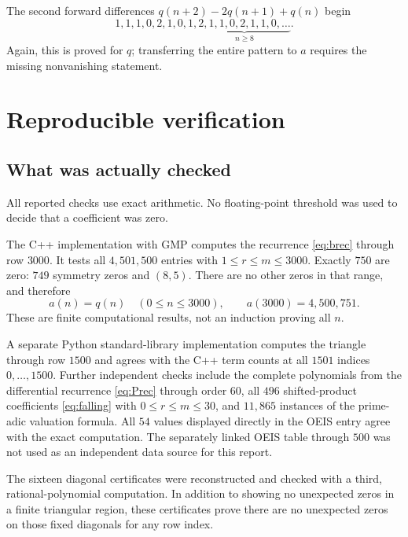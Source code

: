 \documentclass[11pt,a4paper]{article}
\numberwithin{equation}{section}
\theoremstyle{definition}
\theoremstyle{remark}
\begin{document}
The second forward differences $q(n+2)-2q(n+1)+q(n)$ begin
\[
 1,1,1,0,2,1,0,1,\underbrace{2,1,1,0,2,1,1,0,\ldots}_{n\ge8}.
\]
Again, this is proved for $q$; transferring the entire pattern to $a$
requires the missing nonvanishing statement.

\section{Reproducible verification}\label{sec:computation}

\subsection{What was actually checked}
All reported checks use exact arithmetic. No floating-point threshold was
used to decide that a coefficient was zero.

The C++ implementation with GMP computes the recurrence \eqref{eq:brec}
through row $3000$. It tests all $4{,}501{,}500$ entries with
$1\le r\le m\le3000$. Exactly $750$ are zero: $749$ symmetry zeros and
$(8,5)$. There are no other zeros in that range, and therefore
\begin{equation}\label{eq:3000}
 a(n)=q(n)\quad(0\le n\le3000),\qquad
 a(3000)=4{,}500{,}751.
\end{equation}
These are finite computational results, not an induction proving all $n$.

A separate Python standard-library implementation computes the triangle
through row $1500$ and agrees with the C++ term counts at all $1501$
indices $0,\ldots,1500$. Further independent checks include the complete
polynomials from the differential recurrence \eqref{eq:Prec} through order
$60$, all $496$ shifted-product coefficients \eqref{eq:falling} with
$0\le r\le m\le30$, and $11{,}865$ instances of the prime-adic valuation
formula. All $54$ values displayed directly in the OEIS entry agree with
the exact computation. The separately linked OEIS table through $500$ was
not used as an independent data source for this report.

The sixteen diagonal certificates were reconstructed and checked with a
third, rational-polynomial computation. In addition to showing no unexpected
zeros in a finite triangular region, these certificates prove there are no
unexpected zeros on those fixed diagonals for any row index.
\end{document}
